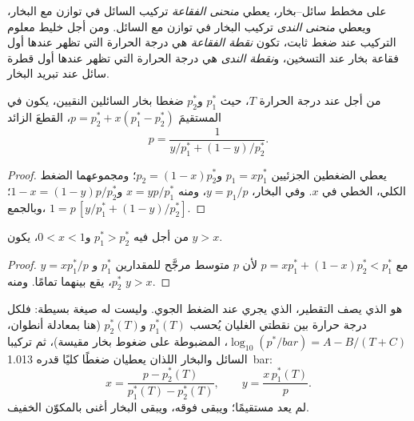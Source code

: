 \begin{definition}\label{def:b2:liquid-vapour-diagrams:bubble-dew}
على مخطط سائل--بخار، يعطي \emph{منحنى الفقاعة}
تركيب السائل في توازن مع البخار، ويعطي \emph{منحنى
الندى} تركيب البخار في توازن مع السائل. ومن أجل
خليط معلوم التركيب عند ضغط ثابت، تكون \emph{نقطة
الفقاعة} هي درجة الحرارة التي تظهر عندها أول فقاعة
بخار عند التسخين، و\emph{نقطة الندى} هي درجة
الحرارة التي تظهر عندها أول قطرة سائل عند تبريد البخار.
\end{definition}

\begin{proposition}\label{prop:b2:liquid-vapour-diagrams:ideal-curves}
من أجل  عند درجة الحرارة $T$، حيث $p_1^*$ و$p_2^*$ ضغطا
بخار السائلين النقيين، يكون  في 
المستقيمَ $p = p_2^* + x(p_1^* - p_2^*)$، 
القطعَ الزائد
\[
  p = \frac{1}{y/p_1^* + (1 - y)/p_2^*} .
\]
\end{proposition}

\begin{proof}
يعطي  الضغطين الجزئيين $p_1 = xp_1^*$ و$p_2 = (1 -
x)p_2^*$؛ ومجموعهما الضغط الكلي، الخطي في $x$. وفي البخار،
$y = p_1/p$، ومنه $x = yp/p_1^*$ و$1 - x = (1 - y)p/p_2^*$؛ وبالجمع،
$1 = p\,[y/p_1^* + (1 - y)/p_2^*]$.
\end{proof}

\begin{proposition}\label{prop:b2:liquid-vapour-diagrams:richer}
من أجل  فيه $p_1^* > p_2^*$ و$0 < x < 1$، يكون $y > x$.
\end{proposition}

\begin{proof}
$y = xp_1^*/p$ مع $p = xp_1^* + (1 - x)p_2^* < p_1^*$ لأن $p$
متوسط مرجَّح للمقدارين $p_1^*$ و$p_2^*$، يقع بينهما تمامًا. ومنه $y >
x$.
\end{proof}

 هو الذي يصف التقطير، الذي يجري عند الضغط
الجوي. وليست له صيغة بسيطة: فلكل درجة حرارة بين
نقطتي الغليان يُحسب $p_1^*(T)$ و$p_2^*(T)$ (هنا بمعادلة
أنطوان، $\log_{10}(p^*/\unit{bar}) = A - B/(T + C)$، المضبوطة على ضغوط
بخار مقيسة)، ثم تركيبا السائل والبخار اللذان
يعطيان ضغطًا كليًا قدره \qty{1.013}{bar}:
\[
  x = \frac{p - p_2^*(T)}{p_1^*(T) - p_2^*(T)}, \qquad y = \frac{x\,p_1^*(T)}{p} .
\]
لم يعد  مستقيمًا؛ ويبقى  فوقه،
ويبقى البخار أغنى بالمكوّن الخفيف.

